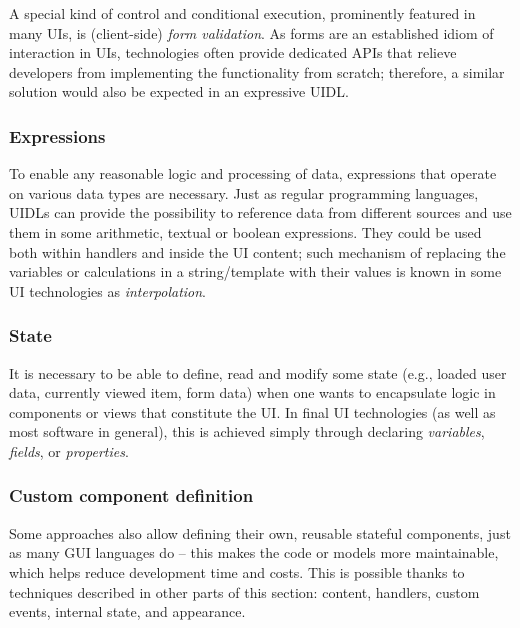A special kind of control and conditional execution, prominently featured in many UIs, is (client-side) \emph{form validation}.
As forms are an established idiom of interaction in UIs, technologies often provide dedicated APIs that relieve developers from implementing the functionality from scratch;
therefore, a similar solution would also be expected in an expressive UIDL\@.

\subsubsection{Expressions}
To enable any reasonable logic and processing of data, expressions that operate on various data types are necessary.
Just as regular programming languages, UIDLs can provide the possibility to reference data from different sources and use them in some arithmetic, textual or boolean expressions.
They could be used both within handlers and inside the UI content;
such mechanism of replacing the variables or calculations in a string/template with their values is known in some UI technologies as \emph{interpolation}.

\subsubsection{State}
It is necessary to be able to define, read and modify some state (e.g., loaded user data, currently viewed item, form data) when one wants to encapsulate logic in components or views that constitute the UI\@.
In final UI technologies (as well as most software in general), this is achieved simply through declaring \emph{variables}, \emph{fields}, or \emph{properties}.

\subsubsection{Custom component definition}
Some approaches also allow defining their own, reusable stateful components, just as many GUI languages do -- this makes the code or models more maintainable, which helps reduce development time and costs.
This is possible thanks to techniques described in other parts of this section: content, handlers, custom events, internal state, and appearance.

